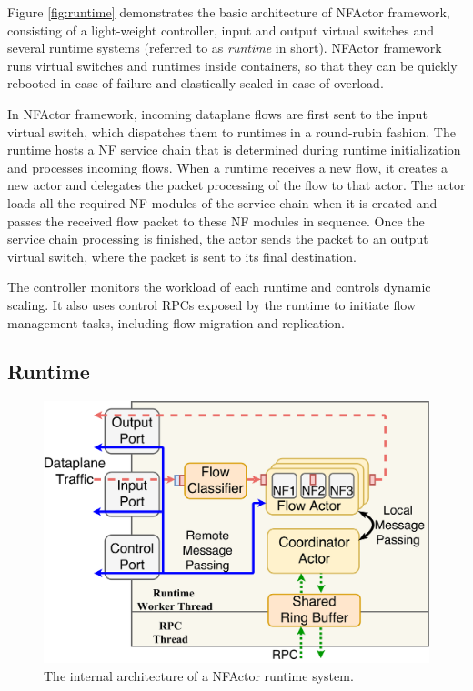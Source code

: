 
Figure \ref{fig:runtime} demonstrates the basic architecture of NFActor framework, consisting of a light-weight controller, input and output virtual switches and several runtime systems (referred to as \textit{runtime} in short). NFActor framework runs virtual switches and runtimes inside containers, so that they can be quickly rebooted in case of failure and elastically scaled in case of overload.

In NFActor framework, incoming dataplane flows are first sent to the input virtual switch, which dispatches them to runtimes in a round-rubin fashion. The runtime hosts a NF service chain that is determined during runtime initialization and processes incoming flows. When a runtime receives a new flow, it creates a new actor and delegates the packet processing of the flow to that actor. The actor loads all the required NF modules of the service chain when it is created and passes the received flow packet to these NF modules in sequence. Once the service chain processing is finished, the actor sends the packet to an output virtual switch, where the packet is sent to its final destination.

The controller monitors the workload of each runtime and controls dynamic scaling. It also uses control RPCs exposed by the runtime to initiate flow management tasks, including flow migration and replication.

\subsection{Runtime}

\begin{figure}
		\centering
		\includegraphics[width=\columnwidth]{figure/new-nfactor-runtime-arch.pdf}

		\caption{The internal architecture of a NFActor runtime system. }
\label{fig:runtime-arch}
\end{figure}

